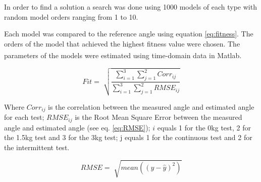 \documentclass[letterpaper, 10 pt, conference]{ieeeconf}  %
\begin{document}
In order to find a solution a search was done using 1000 models of each type with random model orders ranging from 1 to 10. 
% 
% 

% 
% 

Each model was compared to the reference angle using equation \ref{eq:fitness}. The orders of the model that achieved the highest fitness value were chosen. The parameters of the models were estimated using time-domain data in Matlab\textsuperscript{\textregistered}.


\begin{equation}
\label{eq:fitness}
Fit = \sqrt[]{\frac{\sum_{i=1}^{3}\sum_{j=1}^{2} Corr_{ij}}{\sum_{i=1}^{3}\sum_{j=1}^{2} RMSE_{ij}}}
\end{equation}

% 
% 

% 
% 


Where $Corr_{ij}$ is the correlation between the measured angle and estimated angle for each test; $RMSE_{ij}$ is the Root Mean Square Error between the measured angle and estimated angle (see eq. \ref{eq:RMSE}); $i$ equals 1 for the 0kg test, 2 for the 1.5kg test and 3 for the 3kg test; j equals 1 for the continuous test and 2 for the intermittent test.

\begin{equation}
\label{eq:RMSE}
RMSE = \sqrt[]{mean((y-\hat{y})^2)}
\end{equation}
\end{document}
